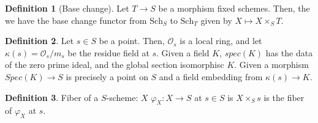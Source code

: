 \documentclass{article}
\theoremstyle{definition}
\theoremstyle{definition}
\newtheorem{definition}{Definition}[theorem]
\theoremstyle{definition}
\theoremstyle{definition}
\theoremstyle{definition}
\theoremstyle{definition}
\theoremstyle{definition}
\begin{document}
\begin{tcolorbox}[colback=purple!5!white,colframe=purple!75!black]
\begin{definition}[Base change]
Let $T\to S$ be a morphism fixed schemes. Then, the we have the base change functor from $\textrm{Sch}_S$ to $\textrm{Sch}_T$ given by $X\mapsto X\times_S T$. 
\end{definition}
\end{tcolorbox}



\begin{tcolorbox}[colback=purple!5!white,colframe=purple!75!black]
\begin{definition}
Let $s\in S$ be a point. Then, $\mathcal{O}_s$ is a local ring, and let $\kappa(s)=\mathcal{O}_s/m_s$ be the residue field at $s$. Given a field $K$, $spec(K)$ has the data of the zero prime ideal, and the global section isomorphisc $K$. Given a morphism $Spec(K)\to S$ is precisely a point on $S$ and a field embedding from $\kappa(s)\to K$. 
\end{definition}
\end{tcolorbox}


\begin{tcolorbox}[colback=purple!5!white,colframe=purple!75!black]
\begin{definition}
Fiber of a $S$-scheme: $X$ $\varphi_X: X\to S$ at $s\in S$ is $X\times_S s$ is the fiber of $\varphi_X$ at $s$. 
\end{definition}
\end{tcolorbox}
\end{document}
